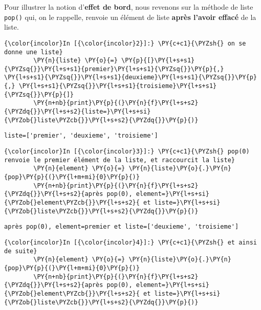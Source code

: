     Pour illustrer la notion d'\textbf{effet de bord}, nous revenons sur la
méthode de liste \texttt{pop()} qui, on le rappelle, renvoie un élément
de liste \textbf{après l'avoir effacé} de la liste.

    \begin{Verbatim}[commandchars=\\\{\}]
{\color{incolor}In [{\color{incolor}2}]:} \PY{c+c1}{\PYZsh{} on se donne une liste}
        \PY{n}{liste} \PY{o}{=} \PY{p}{[}\PY{l+s+s1}{\PYZsq{}}\PY{l+s+s1}{premier}\PY{l+s+s1}{\PYZsq{}}\PY{p}{,} \PY{l+s+s1}{\PYZsq{}}\PY{l+s+s1}{deuxieme}\PY{l+s+s1}{\PYZsq{}}\PY{p}{,} \PY{l+s+s1}{\PYZsq{}}\PY{l+s+s1}{troisieme}\PY{l+s+s1}{\PYZsq{}}\PY{p}{]}
        \PY{n+nb}{print}\PY{p}{(}\PY{n}{f}\PY{l+s+s2}{\PYZdq{}}\PY{l+s+s2}{liste=}\PY{l+s+si}{\PYZob{}liste\PYZcb{}}\PY{l+s+s2}{\PYZdq{}}\PY{p}{)}
\end{Verbatim}


    \begin{Verbatim}[commandchars=\\\{\}]
liste=['premier', 'deuxieme', 'troisieme']

    \end{Verbatim}

    \begin{Verbatim}[commandchars=\\\{\}]
{\color{incolor}In [{\color{incolor}3}]:} \PY{c+c1}{\PYZsh{} pop(0) renvoie le premier élément de la liste, et raccourcit la liste}
        \PY{n}{element} \PY{o}{=} \PY{n}{liste}\PY{o}{.}\PY{n}{pop}\PY{p}{(}\PY{l+m+mi}{0}\PY{p}{)}
        \PY{n+nb}{print}\PY{p}{(}\PY{n}{f}\PY{l+s+s2}{\PYZdq{}}\PY{l+s+s2}{après pop(0), element=}\PY{l+s+si}{\PYZob{}element\PYZcb{}}\PY{l+s+s2}{ et liste=}\PY{l+s+si}{\PYZob{}liste\PYZcb{}}\PY{l+s+s2}{\PYZdq{}}\PY{p}{)}
\end{Verbatim}


    \begin{Verbatim}[commandchars=\\\{\}]
après pop(0), element=premier et liste=['deuxieme', 'troisieme']

    \end{Verbatim}

    \begin{Verbatim}[commandchars=\\\{\}]
{\color{incolor}In [{\color{incolor}4}]:} \PY{c+c1}{\PYZsh{} et ainsi de suite}
        \PY{n}{element} \PY{o}{=} \PY{n}{liste}\PY{o}{.}\PY{n}{pop}\PY{p}{(}\PY{l+m+mi}{0}\PY{p}{)}
        \PY{n+nb}{print}\PY{p}{(}\PY{n}{f}\PY{l+s+s2}{\PYZdq{}}\PY{l+s+s2}{après pop(0), element=}\PY{l+s+si}{\PYZob{}element\PYZcb{}}\PY{l+s+s2}{ et liste=}\PY{l+s+si}{\PYZob{}liste\PYZcb{}}\PY{l+s+s2}{\PYZdq{}}\PY{p}{)}
\end{Verbatim}


